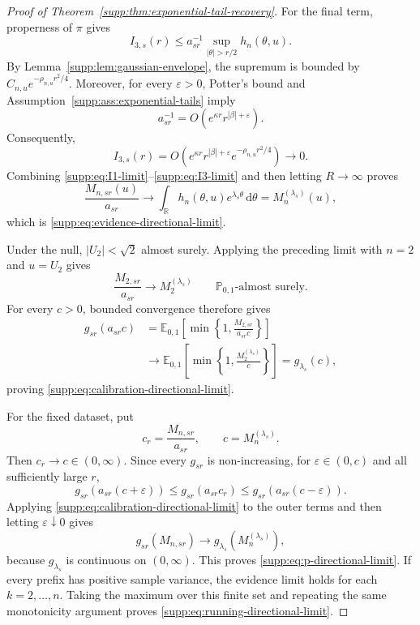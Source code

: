 \documentclass[numsec,webpdf,modern,medium,namedate]{oup-authoring-template}
\theoremstyle{thmstyleone}
\theoremstyle{thmstyletwo}
\newcommand{\R}{\mathbb{R}}
\newcommand{\E}{\mathbb{E}}
\newcommand{\Prob}{\mathbb{P}}
\newcommand{\dd}{\mathrm{d}}
\begin{document}
\begin{proof}[Proof of Theorem~\ref{supp:thm:exponential-tail-recovery}]
For the final term, properness of $\pi$ gives
\begin{equation}
\label{supp:eq:I3-bound}
  I_{3,s}(r)
  \leq
  a_{sr}^{-1}
  \sup_{|\theta|>r/2}h_n(\theta,u).
\end{equation}
By Lemma~\ref{supp:lem:gaussian-envelope}, the supremum is bounded by
$C_{n,u}e^{-\rho_{n,u}r^2/4}$.  Moreover, for every $\varepsilon>0$,
Potter's bound \citep[Theorem~1.5.6]{Bingham1987} and
Assumption~\ref{supp:ass:exponential-tails} imply
\begin{equation}
\label{supp:eq:scale-inverse-bound}
  a_{sr}^{-1}
  =
  O\left(e^{\kappa r}r^{|\beta|+\varepsilon}\right).
\end{equation}
Consequently,
\begin{equation}
\label{supp:eq:I3-limit}
  I_{3,s}(r)
  =
  O\left(
    e^{\kappa r}r^{|\beta|+\varepsilon}
    e^{-\rho_{n,u}r^2/4}
  \right)
  \longrightarrow0.
\end{equation}
Combining \eqref{supp:eq:I1-limit}--\eqref{supp:eq:I3-limit} and then
letting $R\to\infty$ proves
\[
  \frac{M_{n,sr}(u)}{a_{sr}}
  \longrightarrow
  \int_{\R}h_n(\theta,u)e^{\lambda_s\theta}\,\dd\theta
  =
  M_n^{(\lambda_s)}(u),
\]
which is \eqref{supp:eq:evidence-directional-limit}.

Under the null, $|U_2|<\sqrt2$ almost surely.  Applying the preceding
limit with $n=2$ and $u=U_2$ gives
\[
  \frac{M_{2,sr}}{a_{sr}}
  \longrightarrow
  M_2^{(\lambda_s)}
  \qquad
  \Prob_{0,1}\text{-almost surely}.
\]
For every $c>0$, bounded convergence therefore gives
\begin{align}
  g_{sr}(a_{sr}c)
  &={}
  \E_{0,1}\left[
    \min\left\{
      1,
      \frac{M_{2,sr}}{a_{sr}c}
    \right\}
  \right]
  \nonumber\\
  &\longrightarrow
  \E_{0,1}\left[
    \min\left\{
      1,
      \frac{M_2^{(\lambda_s)}}{c}
    \right\}
  \right]
  =
  g_{\lambda_s}(c),
\label{supp:eq:calibration-limit-proof}
\end{align}
proving \eqref{supp:eq:calibration-directional-limit}.

For the fixed dataset, put
\[
  c_r=\frac{M_{n,sr}}{a_{sr}},
  \qquad
  c=M_n^{(\lambda_s)}.
\]
Then $c_r\to c\in(0,\infty)$.  Since every $g_{sr}$ is
non-increasing, for $\varepsilon\in(0,c)$ and all sufficiently large
$r$,
\[
  g_{sr}\left(a_{sr}(c+\varepsilon)\right)
  \leq
  g_{sr}(a_{sr}c_r)
  \leq
  g_{sr}\left(a_{sr}(c-\varepsilon)\right).
\]
Applying \eqref{supp:eq:calibration-directional-limit} to the outer
terms and then letting $\varepsilon\downarrow0$ gives
\[
  g_{sr}(M_{n,sr})
  \longrightarrow
  g_{\lambda_s}\left(M_n^{(\lambda_s)}\right),
\]
because $g_{\lambda_s}$ is continuous on $(0,\infty)$.  This proves
\eqref{supp:eq:p-directional-limit}.  If every prefix has positive
sample variance, the evidence limit holds for each $k=2,\ldots,n$.
Taking the maximum over this finite set and repeating the same
monotonicity argument proves
\eqref{supp:eq:running-directional-limit}.
\end{proof}
\end{document}
